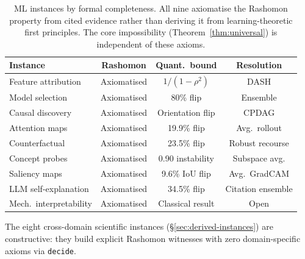 \documentclass[11pt,a4paper]{article}
\begin{document}
\begin{table}[h]
\centering
\small
\caption{ML instances by formal completeness. All nine axiomatise the Rashomon property from cited evidence rather than deriving it from learning-theoretic first principles. The core impossibility (Theorem~\ref{thm:universal}) is independent of these axioms.}
\label{tab:ml-tiers}
\begin{tabular}{lccc}
\toprule
Instance & Rashomon & Quant.\ bound & Resolution \\
\midrule
Feature attribution & Axiomatised & $1/(1{-}\rho^2)$ & DASH \\
Model selection & Axiomatised & 80\% flip & Ensemble \\
Causal discovery & Axiomatised & Orientation flip & CPDAG \\
Attention maps & Axiomatised & 19.9\% flip & Avg.\ rollout \\
Counterfactual & Axiomatised & 23.5\% flip & Robust recourse \\
Concept probes & Axiomatised & 0.90 instability & Subspace avg. \\
Saliency maps & Axiomatised & 9.6\% IoU flip & Avg.\ GradCAM \\
LLM self-explanation & Axiomatised & 34.5\% flip & Citation ensemble \\
Mech.\ interpretability & Axiomatised & Classical result & Open \\
\bottomrule
\end{tabular}
\end{table}

The eight cross-domain scientific instances (\S\ref{sec:derived-instances}) are constructive: they build explicit Rashomon witnesses with zero domain-specific axioms via \texttt{decide}.


















\end{document}
